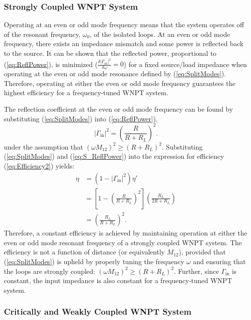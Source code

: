 \documentclass[journal]{IEEEtran}
\begin{document}
\subsubsection{Strongly Coupled WNPT System}

Operating at an even or odd mode frequency means that the system operates off of the resonant frequency, $\omega_0$, of the isolated loops. At an even or odd mode frequency, there exists an impedance mismatch and some power is reflected back to the source. It can be shown that the reflected power, proportional to (\ref{eq:ReflPower}), is minimized ($\frac{\delta \left| \Gamma_{\mathrm{in}} \right|^2}{\delta \omega} = 0$) for a fixed source/load impedance when operating at the even or odd mode resonance defined by (\ref{eq:SplitModes}). Therefore, operating at either the even or odd mode frequency guarantees the highest efficiency for a frequency-tuned WNPT system.

The reflection coefficient at the even or odd mode frequency can be found by substituting (\ref{eq:SplitModes}) into (\ref{eq:ReflPower}),
\begin{equation}
\left|\Gamma_{\mathrm{in}}\right|^2 =  \left(\frac{R}{R+R_L}\right)^2.
\label{eq:S_ReflPower}
\end{equation}
under the assumption that $\left(\omega M_{12}\right)^2 \ge \left(R+R_L\right)^2$. Substituting (\ref{eq:SplitModes}) and (\ref{eq:S_ReflPower}) into the expression for efficiency (\ref{eq:Efficiency2}) yields:
\begin{align}
\eta &=  \left(1-\left|\Gamma_{\mathrm{in}}\right|^2\right) \eta' \\
&= \left[1-\left(\frac{R}{R+R_L}\right)^2 \right] \left( \frac{R_L}{2R + R_L}\right) \\
&= \left(\frac{R_L}{R+R_L}\right)^2.
\label{eq:StrongCoupledEff}
\end{align}
Therefore, a constant efficiency is achieved by maintaining operation at either the even or odd mode resonant frequency of a strongly coupled WNPT system. The efficiency is not a function of distance (or equivalently  $M_{12}$), provided that (\ref{eq:SplitModes}) is upheld by properly tuning the frequency $\omega$ and ensuring that the loops are strongly coupled: $\left(\omega M_{12}\right)^2 \ge \left(R+R_L\right)^2$. Further, since $\Gamma_{\mathrm{in}}$ is constant, the input impedance is also constant for a frequency-tuned WNPT system.

\subsubsection{Critically and Weakly Coupled WNPT System}
\end{document}
